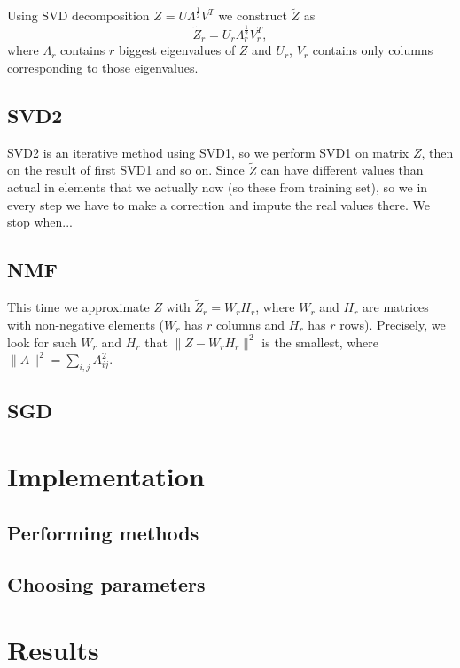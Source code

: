 \documentclass[11pt]{amsart}
\begin{document}
Using SVD decomposition $Z = U \Lambda^{\frac{1}{2}} V^T$ we construct $\tilde{Z}$ as
\[\tilde{Z}_r = U_r \Lambda_r^{\frac{1}{2}}V_r^T,\]
where $\Lambda_r$ contains $r$ biggest eigenvalues of $Z$ and $U_r$, $V_r$ contains only columns corresponding to those eigenvalues.

\subsection*{SVD2}

SVD2 is an iterative method using SVD1, so we perform SVD1 on matrix $Z$, then on the result of first SVD1 and so on.
Since $\tilde{Z}$ can have different values than actual in elements that we actually now (so these from training set), so we in every step we have to make a correction and  impute the real values there.
We stop when...

\subsection*{NMF}
This time we approximate $Z$ with $\tilde{Z}_r = W_r H_r $, where $W_r$ and $H_r$ are matrices with non-negative elements ($W_r$ has $r$ columns and $H_r$ has $r$ rows).
Precisely, we look for such $W_r$ and $H_r$ that $\|Z - W_r H_r \|^2$ is the smallest, where $\|A\|^2 = \sum_{i, j} A_{ij}^2$.

\subsection*{SGD}


\section{Implementation}
\subsection*{Performing methods}
\subsection*{Choosing parameters}

\section{Results}
\end{document}

